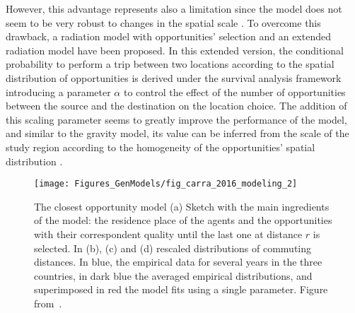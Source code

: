 However, this advantage represents also a limitation since the model does not seem to be very robust to changes in the spatial scale \cite{lenormand_2012_universal, masucci_2013_gravity, liang_2013_unraveling, lenormand_2015_systematic}. To overcome this drawback, a radiation model with opportunities' selection \cite{simini_2013_human} and an extended radiation model \cite{yang_2014_limits} have been proposed. In this extended version, the conditional probability to perform a trip between two locations according to the spatial distribution of opportunities is derived under the survival analysis framework introducing a parameter $\alpha$ to control the effect of the number of opportunities between the source and the destination on the location choice. The addition of this scaling parameter seems to greatly improve the performance of the model, and similar to the gravity model, its value can be inferred from the scale of the study region according to the homogeneity of the opportunities' spatial distribution \cite{yang_2014_limits,lenormand_2015_systematic}.

\begin{figure}[t!]
\centering
\texttt{[image: Figures\_GenModels/fig\_carra\_2016\_modeling\_2]}
\caption{ The closest opportunity model (a) Sketch with the main ingredients of the model: the residence place of the agents and the opportunities with their correspondent quality until the last one at distance $r$ is selected. In (b), (c) and (d) rescaled distributions of commuting distances. In blue, the empirical data for several years in the three countries, in dark blue the averaged empirical distributions, and superimposed in red the model fits using a single parameter. Figure from~\cite{carra_2016_modeling}. 
\label{fig:carra_2016_modeling_2}}
\end{figure}



